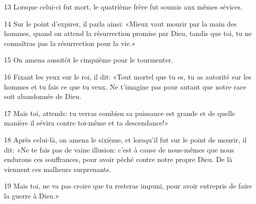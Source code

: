 13 Lorsque celui-ci fut mort, le quatrième frère fut soumis aux mêmes sévices.

14 Sur le point d’expirer, il parla ainsi: «Mieux vaut mourir par la main des hommes, quand on attend la résurrection promise par Dieu, tandis que toi, tu ne connaîtras pas la résurrection pour la vie.»

15 On amena aussitôt le cinquième pour le tourmenter.

16 Fixant les yeux sur le roi, il dit: «Tout mortel que tu es, tu as autorité sur les hommes et tu fais ce que tu veux. Ne t’imagine pas pour autant que notre race soit abandonnée de Dieu.

17 Mais toi, attends: tu verras combien sa puissance est grande et de quelle manière il sévira contre toi-même et ta descendance!»

18 Après celui-là, on amena le sixième, et lorsqu’il fut sur le point de mourir, il dit: «Ne te fais pas de vaine illusion: c’est à cause de nous-mêmes que nous endurons ces souffrances, pour avoir péché contre notre propre Dieu. De là viennent ces malheurs surprenants.

19 Mais toi, ne va pas croire que tu resteras impuni, pour avoir entrepris de faire la guerre à Dieu.»